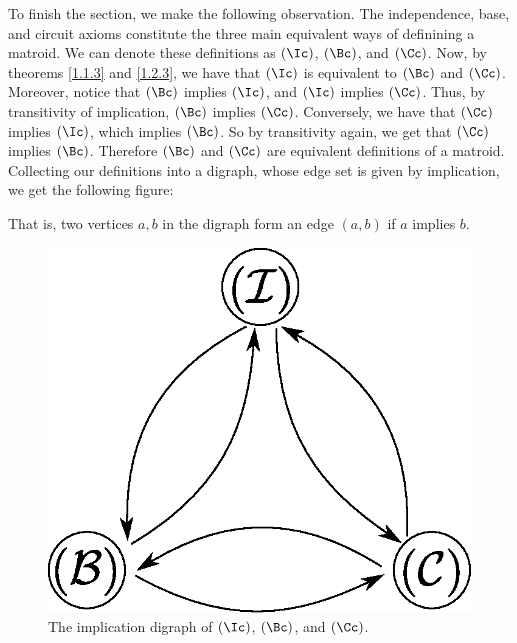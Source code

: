 To finish the section, we make the following observation. The independence,
base, and circuit axioms constitute the three main equivalent ways of definining
a matroid. We can denote these definitions as $(\Ic)$, $(\Bc)$, and $(\Cc)$.
Now, by theorems \ref{1.1.3} and  \ref{1.2.3}, we have that $(\Ic)$ is
equivalent to  $(\Bc)$ and $(\Cc)$. Moreover, notice that $(\Bc)$ implies
$(\Ic)$, and $(\Ic)$ implies $(\Cc)$. Thus, by transitivity of implication,
$(\Bc)$ implies $(\Cc)$. Conversely, we have that $(\Cc)$ implies $(\Ic)$, which
implies $(\Bc)$. So by transitivity again, we get that $(\Cc)$ implies $(\Bc)$.
Therefore $(\Bc)$ and $(\Cc)$ are equivalent definitions of a matroid. Collecting
our definitions into a digraph, whose edge set is given by implication,
we get the following figure:
\begin{remark}
    That is, two vertices $a,b$ in the digraph form an edge  $(a,b)$ if $a$
    implies  $b$.
\end{remark}

\begin{figure}[h]
    \centering
    \includegraphics[scale=0.5]{Figures/Chapter1/equiv_def_1.eps}
    \caption{The implication digraph of $(\Ic)$, $(\Bc)$, and $(\Cc)$.}
    \label{fig_1.3}
\end{figure}
